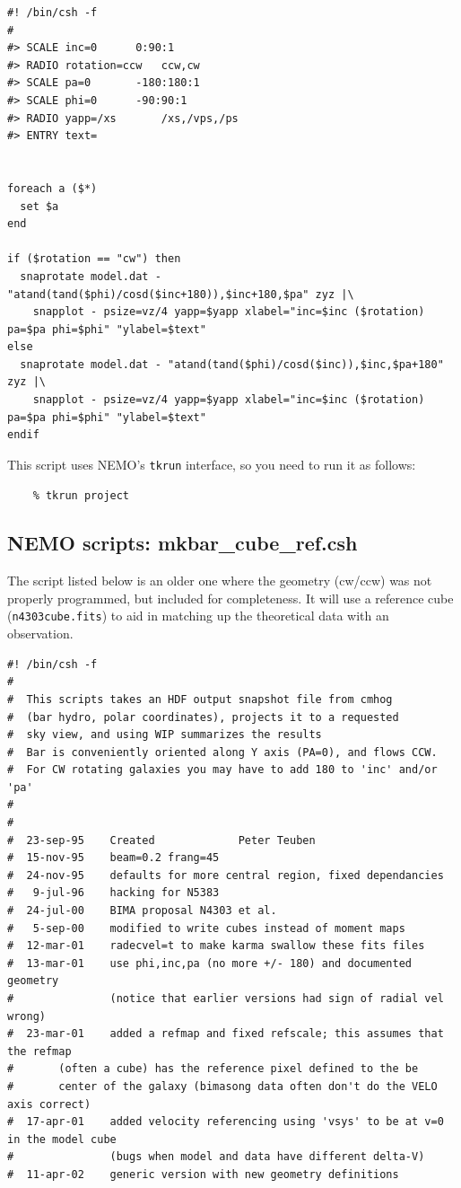 \documentclass[10pt,dvips]{article}
\begin{document}
{\footnotesize\begin{verbatim}
#! /bin/csh -f 
#
#> SCALE inc=0		0:90:1
#> RADIO rotation=ccw   ccw,cw
#> SCALE pa=0		-180:180:1
#> SCALE phi=0		-90:90:1
#> RADIO yapp=/xs       /xs,/vps,/ps
#> ENTRY text=  


foreach a ($*)
  set $a
end

if ($rotation == "cw") then
  snaprotate model.dat - "atand(tand($phi)/cosd($inc+180)),$inc+180,$pa" zyz |\
    snapplot - psize=vz/4 yapp=$yapp xlabel="inc=$inc ($rotation) pa=$pa phi=$phi" "ylabel=$text"
else
  snaprotate model.dat - "atand(tand($phi)/cosd($inc)),$inc,$pa+180" zyz |\
    snapplot - psize=vz/4 yapp=$yapp xlabel="inc=$inc ($rotation) pa=$pa phi=$phi" "ylabel=$text"
endif

\end{verbatim}\normalsize

This script uses NEMO's {\tt tkrun} interface, so you need to run it
as follows:

\footnotesize\begin{verbatim}
    % tkrun project
\end{verbatim}\normalsize

\subsection{NEMO scripts: mkbar\_cube\_ref.csh}

The script listed below is an older one where the geometry (cw/ccw) was not 
properly programmed, but included for completeness. It will use a reference
cube ({\tt n4303cube.fits}) to aid in matching up the theoretical data with
an observation.

\footnotesize\begin{verbatim}
#! /bin/csh -f
#
#  This scripts takes an HDF output snapshot file from cmhog
#  (bar hydro, polar coordinates), projects it to a requested
#  sky view, and using WIP summarizes the results
#  Bar is conveniently oriented along Y axis (PA=0), and flows CCW.
#  For CW rotating galaxies you may have to add 180 to 'inc' and/or 'pa'
#
#
#  23-sep-95	Created				Peter Teuben
#  15-nov-95    beam=0.2 frang=45
#  24-nov-95    defaults for more central region, fixed dependancies
#   9-jul-96    hacking for N5383 
#  24-jul-00    BIMA proposal N4303 et al.
#   5-sep-00    modified to write cubes instead of moment maps
#  12-mar-01    radecvel=t to make karma swallow these fits files
#  13-mar-01    use phi,inc,pa (no more +/- 180) and documented geometry
#               (notice that earlier versions had sign of radial vel wrong)
#  23-mar-01    added a refmap and fixed refscale; this assumes that the refmap
#		(often a cube) has the reference pixel defined to the be 
#		center of the galaxy (bimasong data often don't do the VELO axis correct)
#  17-apr-01    added velocity referencing using 'vsys' to be at v=0 in the model cube
#               (bugs when model and data have different delta-V)
#  11-apr-02    generic version with new geometry definitions


\end{verbatim}}
\end{document}
